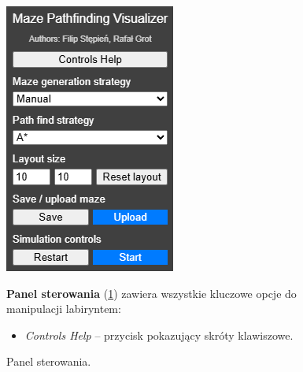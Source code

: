 \documentclass[../doc.tex]{subfiles}
\begin{document}
\begin{figure}[H]
  \centering
  \begin{minipage}[c]{0.35\textwidth}
    \centering
    \includegraphics[width=\linewidth]{figures/controls.png}
    \caption{Panel sterowania.}
    \label{fig:control_panel}
  \end{minipage}
  \hfill
  \begin{minipage}[c]{0.6\textwidth}
    \textbf{Panel sterowania} (\cref{fig:control_panel}) zawiera wszystkie kluczowe opcje do manipulacji labiryntem:

    \begin{itemize}
      \item \textit{Controls Help} – przycisk pokazujący skróty klawiszowe.


\end{itemize}
\end{minipage}
\end{figure}
\end{document}
